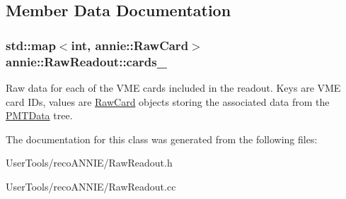 \subsection{Member Data Documentation}
\hypertarget{classannie_1_1RawReadout_a7326e38c87830bfc38205850fa557d8c}{
\subsubsection[{cards\_\-}]{\setlength{\rightskip}{0pt plus 5cm}std::map$<$int, {\bf annie::RawCard}$>$ {\bf annie::RawReadout::cards\_\-}}}
\label{classannie_1_1RawReadout_a7326e38c87830bfc38205850fa557d8c}


Raw data for each of the VME cards included in the readout. Keys are VME card IDs, values are \hyperlink{classannie_1_1RawCard}{RawCard} objects storing the associated data from the \hyperlink{classPMTData}{PMTData} tree. 

The documentation for this class was generated from the following files:\begin{DoxyCompactItemize}
\item 
UserTools/recoANNIE/RawReadout.h\item 
UserTools/recoANNIE/RawReadout.cc\end{DoxyCompactItemize}
